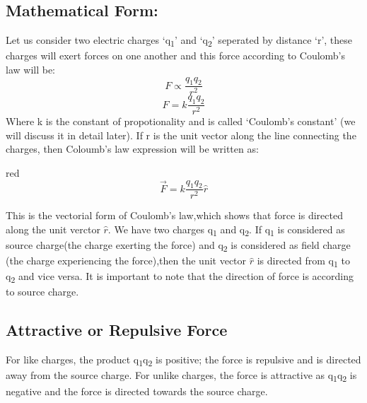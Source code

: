 \subsection*{Mathematical Form:}
Let us consider two electric charges `q\textsubscript{1}' and `q\textsubscript{2}' 
seperated by distance `r', these charges will exert forces on one another and this 
force according to Coulomb’s law will be:
\begin{equation}
  F \propto \frac{q_{1}q_{2}}{r^{2}} \nonumber
\end{equation}
\begin{equation} \label{eq:11.1}
  F = k \frac{q_{1}q_{2}}{r^{2}} 
\end{equation}
Where k is the constant of propotionality and 
is called `Coulomb’s constant' (we will discuss it in detail later). If r is the unit vector along the line connecting the charges, then 
Coloumb’s law expression will be written as:
\begin{mybox}{red}{}
\begin{equation}\label{eq:11.2}
  \vec{F} = k \frac{q_{1}q_{2}}{r^{2}} \hat{r}
\end{equation}
\end{mybox}
This is the vectorial form of Coulomb's law,which shows that force is directed along the unit verctor $\hat{r}$.
We have two charges q\textsubscript{1} and q\textsubscript{2}. If q\textsubscript{1} is considered as
source charge(the charge exerting the force) and q\textsubscript{2} is considered
as field charge (the charge experiencing the force),then the unit vector $\hat{r}$
is directed from q\textsubscript{1} to q\textsubscript{2} and vice versa.
It is important to note that the direction of force is according to source charge.
\subsection*{Attractive or Repulsive Force}
For like charges, the product q\textsubscript{1}q\textsubscript{2} is positive;
the force is repulsive and is directed away from
the source charge. For unlike charges,
the force is attractive as q\textsubscript{1}q\textsubscript{2} is negative and the force is directed
towards the source charge.
